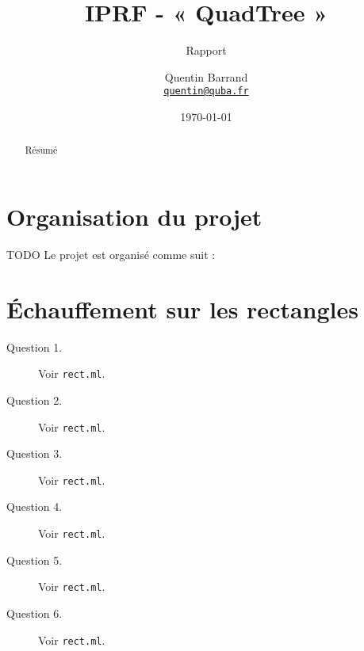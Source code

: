 \documentclass[11pt]{scrartcl}
\newcommand{\filename}[1]{\texttt{\textcolor{RawSienna}{#1}}}
\begin{document}
\title{\textbf{IPRF - « QuadTree »}}
\subtitle{Rapport}

\author{Quentin Barrand\\
		\href{mailto:quentin@quba.fr}{\texttt{quentin@quba.fr}}}
		
\date{\today}

\maketitle

\begin{abstract}
Résumé
\end{abstract}

\break

\section*{Organisation du projet}

TODO
Le projet est organisé comme suit :


\section{Échauffement sur les rectangles}

\begin{description}
\item[Question 1.] Voir \filename{rect.ml}.

\item[Question 2.] Voir \filename{rect.ml}.

\item[Question 3.] Voir \filename{rect.ml}.

\item[Question 4.] Voir \filename{rect.ml}.

\item[Question 5.] Voir \filename{rect.ml}.

\item[Question 6.] Voir \filename{rect.ml}.
\end{description}
\end{document}
